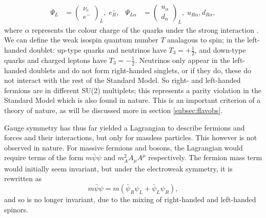 \documentclass[a4paper,12pt]{article}
\begin{document}
\begin{align}
    \label{eq:doublet}
    \Psi_L &=\begin{pmatrix} \nu_e \\ e^- \end{pmatrix}_L,\; e_R^-, & \Psi_{L\alpha} &=\begin{pmatrix} u_\alpha \\ d_\alpha\end{pmatrix}_L,\; u_{R\alpha},d_{R\alpha},
\end{align}
where $\alpha$ represents the colour charge of the quarks under the strong interaction \cite{kane}.
We can define the weak isospin quantum number $T$ analagous to spin; in the left-handed doublet: up-type quarks and neutrinos have $T_3=+\frac12$, and down-type quarks and charged leptons have $T_3=-\frac12$.
Neutrinos only appear in the left-handed doublets and do not form right-handed singlets, or if they do, these do not interact with the rest of the Standard Model.
So right- and left-handed fermions are in different SU(2) multiplets; this represents a parity violation in the Standard Model which is also found in nature. 
This is an important criterion of a theory of nature, as will be discussed more in section \ref{subsec:flavobs}.

Gauge symmetry has thus far yielded a Lagrangian to describe fermions and forces and their interactions, but only for massless particles. 
This however is not observed in nature. 
For massive fermions and bosons, the Lagrangian would require terms of the form $m\bar{\psi}\psi$ and $m_A^2A_\mu A^\mu$ respectively.
The fermion mass term would initially seem invariant, but under the electroweak symmetry, it is rewritten as
\begin{equation}
    \label{eq:mass}
    m\bar{\psi}\psi = m(\bar{\psi}_R\psi_L+\bar{\psi}_L\psi_R),
\end{equation}
and so is no longer invariant, due to the mixing of right-handed and left-handed spinors. 
\end{document}
